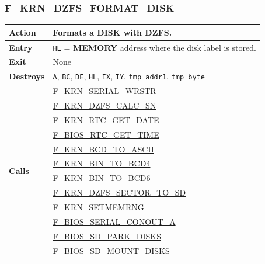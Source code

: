 \documentclass[a4paper,11pt]{article}
\begin{document}
        \subsubsection{F\_KRN\_DZFS\_FORMAT\_DISK}
        \label{func:fkrndzfsformatdisk}
        \begin{tabular}{l p{9cm}}
            \hline\textbf{Action}
            & Formats a \textbf{DISK} with DZFS.\\
            \hline\textbf{Entry}
            & \texttt{HL} = \textbf{MEMORY} address where the disk label is
            stored.\\
            \hline\textbf{Exit} & None\\
            \hline\textbf{Destroys} & \texttt{A}, \texttt{BC}, \texttt{DE},
            \texttt{HL}, \texttt{IX}, \texttt{IY}, \texttt{tmp\_addr1},
            \texttt{tmp\_byte}\\
            \hline\multirow[t]{12}{4em}{\textbf{Calls}}
            & \hyperref[func:fkrnserialwrstr]{F\_KRN\_SERIAL\_WRSTR}\\
            & \hyperref[func:fkrndzfscalcsn]{F\_KRN\_DZFS\_CALC\_SN}\\
            & \hyperref[func:fkrnrtcgetdate]{F\_KRN\_RTC\_GET\_DATE}\\
            & \hyperref[func:fbiosrtcgettime]{F\_BIOS\_RTC\_GET\_TIME}\\
            & \hyperref[func:fkrnbcdtoascii]{F\_KRN\_BCD\_TO\_ASCII}\\
            & \hyperref[func:fkrnbintobcd4]{F\_KRN\_BIN\_TO\_BCD4}\\
            & \hyperref[func:fkrnbintobcd6]{F\_KRN\_BIN\_TO\_BCD6}\\
            & \hyperref[func:fkrndzfssectortodisk]{F\_KRN\_DZFS\_SECTOR\_TO\_SD}\\
            & \hyperref[func:fkrnsetmemrng]{F\_KRN\_SETMEMRNG}\\
            & \hyperref[func:fbiosserialconouta]{F\_BIOS\_SERIAL\_CONOUT\_A}\\
            & \hyperref[func:fbiossdparkdisks]{F\_BIOS\_SD\_PARK\_DISKS}\\
            & \hyperref[func:fbiossdmountdisks]{F\_BIOS\_SD\_MOUNT\_DISKS}\\
            \hline
        \end{tabular}
\end{document}
